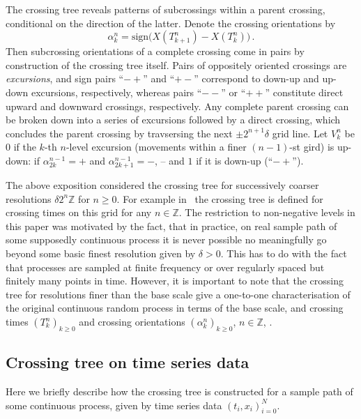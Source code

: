 \documentclass[a4paper]{article}
\begin{document}

The crossing tree reveals patterns of subcrossings within a parent crossing,
conditional on the direction of the latter. Denote the crossing orientations by
\[ \alpha_k^n = \text{sign}\bigl( X(T_{k+1}^n) - X(T_k^n)\bigr)
    \,. \]
Then subcrossing orientations of a complete crossing come in pairs by construction
of the crossing tree itself. Pairs of oppositely oriented crossings are
\emph{excursions}, and sign pairs ``$-+$'' and ``$+-$'' correspond to down-up
and up-down excursions, respectively, whereas pairs ``$--$'' or ``$++$'' constitute
direct upward and downward crossings, respectively. Any complete parent crossing
can be broken down into a series of excursions followed by a direct crossing, which
concludes the parent crossing by travsersing the next $\pm2^{n+1} \delta$ grid line.
Let $V_k^n$ be $0$ if the $k$-th $n$-level excursion (movements within a finer $(n-1)$-st
gird) is up-down: if $\alpha_{2k}^{n-1} = +$ and $\alpha_{2k+1}^{n-1} = -$, --
and $1$ if it is down-up (``$-+$'').

The above exposition considered the crossing tree for successively coarser resolutions
$\delta 2^n \mathbb{Z}$ for $n\geq0$. For example in~\cite{decrouez2013}
the crossing tree is defined for crossing times on this grid for any $n\in\mathbb{Z}$.
The restriction to non-negative levels in this paper was motivated by the fact,
that in practice, on real sample path of some supposedly continuous process it
is never possible no meaningfully go beyond some basic finest resolution given
by $\delta>0$. This has to do with the fact that processes are sampled at finite
frequency or over regularly spaced but finitely many points in time. However, it
is important to note that the crossing tree for resolutions finer than the base
scale give a one-to-one characterisation of the original continuous random process
in terms of the base scale, and crossing times $(T_k^n)_{k\geq 0}$ and crossing
orientations $(\alpha_k^n)_{k\geq 0}$, $n\in \mathbb{Z}$, \cite{decrouez2013, ECP1673}.


\subsection{Crossing tree on time series data} %
\label{sub:crossing_tree_on_time_series_data}

Here we briefly describe how the crossing tree is constructed for a sample
path of some continuous process, given by time series data $(t_i, x_i)_{i=0}^N$.
\end{document}
